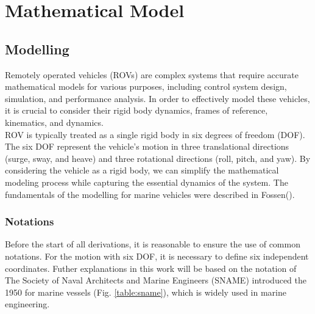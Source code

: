 \chapter{Mathematical Model}
\label{chap:mat}



\section{Modelling}


    Remotely operated vehicles (ROVs) are complex systems that require accurate mathematical models for various purposes, including control system design, simulation, and performance analysis.
    In order to effectively model these vehicles, it is crucial to consider their rigid body dynamics, frames of reference, kinematics, and dynamics.\\
    ROV is typically treated as a single rigid body in six degrees of freedom (DOF). 
    The six DOF represent the vehicle's motion in three translational directions (surge, sway, and heave) and three rotational directions (roll, pitch, and yaw). 
    By considering the vehicle as a rigid body, we can simplify the mathematical modeling process while capturing the essential dynamics of the system.
    The fundamentals of the modelling for marine vehicles were described in Fossen().
    
    \subsection{Notations}


    Before the start of all derivations, it is reasonable to ensure the use of common notations.
    For the motion with six DOF, it is necessary to define six independent coordinates.
    Futher explanations in this work will be based on the notation of The Society of Naval Architects and Marine Engineers (SNAME) introduced the 1950 for marine vessels (Fig. \ref{table:sname}), 
    which is widely used in marine engineering.


